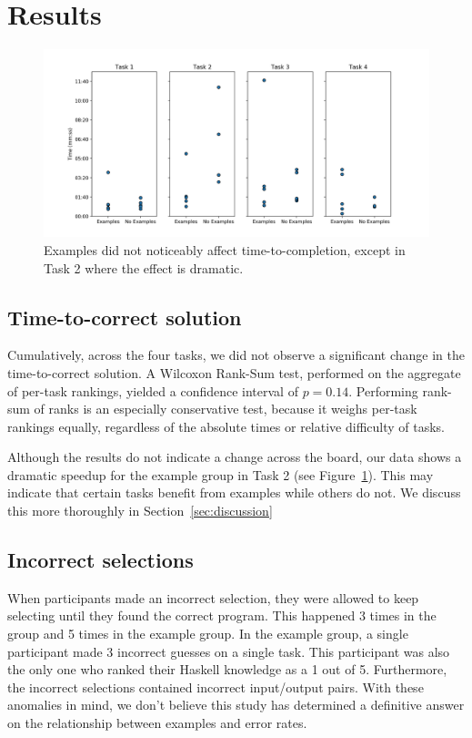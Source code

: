 \section{Results}
\begin{figure}[ht]
  \centering
  \includegraphics[width=\textwidth]{results/task_points.png}
  \caption{
    Examples did not noticeably affect time-to-completion, except in Task 2
    where the effect is dramatic.
  }
  \label{fig:data-points}
\end{figure}
\subsection{Time-to-correct solution}
Cumulatively, across the four tasks, we did not observe a significant change
in the time-to-correct solution.
%
A Wilcoxon Rank-Sum test, performed on the aggregate of per-task rankings,
yielded a confidence interval of $p=0.14$.
%
Performing rank-sum of ranks is an especially conservative test, because it weighs
per-task rankings equally, regardless of the absolute times or relative
difficulty of tasks.

Although the results do not indicate a change across the board, our data shows a dramatic
speedup for the example group in Task 2 (see Figure~\ref{fig:data-points}).
%
This may indicate that certain tasks benefit from examples while others do not.
%
We discuss this more thoroughly in Section~\ref{sec:discussion}

\subsection{Incorrect selections}
When participants made an incorrect selection, they were allowed to keep
selecting until they found the correct program.
%
This happened 3 times in the \noexamples group and 5 times in the example group.
%
In the example group, a single participant made 3 incorrect guesses on a
single task.
%
This participant was also the only one who ranked their Haskell knowledge as a 1 out of 5.
%
Furthermore, the incorrect selections contained incorrect input/output pairs.
%
With these anomalies in mind, we don't believe this study has determined a definitive answer
on the relationship between examples and error rates.

